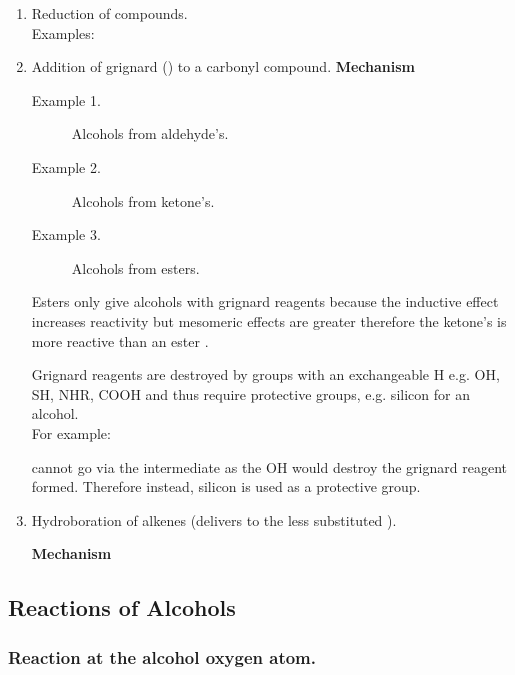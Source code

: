 \begin{enumerate}

	\item Reduction of  compounds.\\
		Examples:

	\item Addition of grignard () to a carbonyl compound.
		\textbf{Mechanism}

		\begin{description}
			\item[Example 1.] Alcohols from aldehyde's.\\

			\item[Example 2.] Alcohols from ketone's.\\

			\item[Example 3.] Alcohols from esters.\\
		\end{description}

		Esters only give alcohols with grignard reagents because the inductive
		effect increases reactivity but mesomeric effects are greater therefore
		the ketone's  is more reactive than an ester .


		Grignard reagents are destroyed by groups with an exchangeable H e.g. OH,
		SH, NHR, COOH and thus require protective groups, e.g. silicon for an
		alcohol.\\

		For example:

		 cannot go via the intermediate
		 as the OH would destroy the
		grignard reagent formed. Therefore instead, silicon is used as a protective group.


	\item Hydroboration of alkenes (delivers  to the less substituted
	).


	\textbf{Mechanism}


\end{enumerate}

\subsection{Reactions of Alcohols}
\subsubsection{Reaction at the alcohol oxygen atom.}